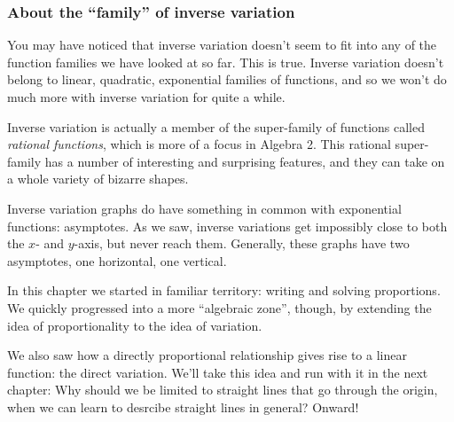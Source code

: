 \subsubsection{About the ``family'' of inverse variation}

You may have noticed that inverse variation doesn't seem to fit into any of the function families we have looked at so far. This is true. Inverse variation doesn't belong to linear, quadratic, exponential families of functions, and so we won't do much more with inverse variation for quite a while.

Inverse variation is actually a member of the super-family of functions called \textit{rational functions}, which is more of a focus in Algebra 2. This rational super-family has a number of interesting and surprising features, and they can take on a whole variety of bizarre shapes.

Inverse variation graphs do have something in common with exponential functions: asymptotes. As we saw, inverse variations get impossibly close to both the $x$- and $y$-axis, but never reach them. Generally, these graphs have two asymptotes, one horizontal, one vertical.

\chaptersummary

In this chapter we started in familiar territory: writing and solving proportions. We quickly progressed into a more ``algebraic zone'', though, by extending the idea of proportionality to the idea of variation.

We also saw how a directly proportional relationship gives rise to a linear function: the direct variation. We'll take this idea and run with it in the next chapter: Why should we be limited to straight lines that go through the origin, when we can learn to desrcibe straight lines in general? Onward!
